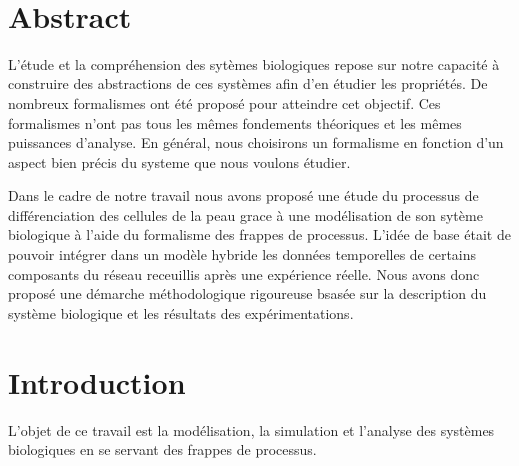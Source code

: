 \documentclass[11pt,a4paper,twoside]{epig}
\begin{document}
\\

\section*{Abstract}
\vspace{-2mm}

L'étude et la compréhension des sytèmes biologiques repose sur notre capacité à construire des abstractions de ces systèmes 
afin d'en étudier les propriétés. De nombreux formalismes ont été proposé pour atteindre cet objectif.  Ces formalismes n'ont 
pas tous les mêmes fondements théoriques et les mêmes puissances d'analyse. En général, nous choisirons un formalisme en fonction 
d'un aspect bien précis du systeme que nous voulons étudier. 

Dans le cadre de notre travail nous avons proposé une étude du processus de différenciation des cellules de la peau grace à une 
modélisation de son sytème  biologique à l'aide du formalisme des frappes de processus. L'idée de base était de pouvoir intégrer
dans un modèle hybride les données temporelles de certains composants du réseau receuillis après une expérience réelle.  
Nous avons donc proposé une démarche méthodologique rigoureuse bsasée sur la description du système biologique et les résultats 
des expérimentations.

\vspace{-2mm}



\section{Introduction}

L'objet de ce travail est la modélisation, la simulation et l'analyse des systèmes biologiques en se servant des frappes de processus. 
\end{document}
